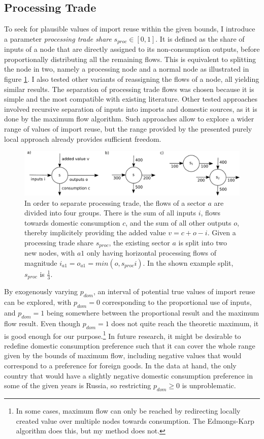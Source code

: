 \documentclass[english]{uzhpub}
\begin{document}
\subsection{Processing Trade}
To seek for plausible values of import reuse within the given bounds, I introduce a parameter \emph{processing trade share} $s_{proc} \in [0,1]$. It is defined as the share of inputs of a node that are directly assigned to its non-consumption outputs, before proportionally distributing all the remaining flows. This is equivalent to splitting the node in two, namely a processing node and a normal node as illustrated in figure \ref{fig:sketch}. I also tested other variants of reassigning the flows of a node, all yielding similar results. The separation of processing trade flows was chosen because it is simple and the most compatible with existing literature. Other tested approaches involved recursive separation of inputs into imports and domestic sources, as it is done by the maximum flow algorithm. Such approaches allow to explore a wider range of values of import reuse, but the range provided by the presented purely local approach already provides sufficient freedom.

\begin{figure}
\centering
\includegraphics[scale=0.8]{../results/sketch}
\caption{In order to separate processing trade, the flows of a sector $a$ are divided into four groups. There is the sum of all inputs $i$, flows towards domestic consumption $c$, and the sum of all other outputs $o$, thereby implicitely providing the added value $v = c + o - i$. Given a processing trade share $s_{proc}$, the existing sector $a$ is split into two new nodes, with $a1$ only having horizontal processing flows of magnitude $i_{a1}=o_{a1}=min(o, s_{proc}i)$. In the shown example split, $s_{proc}$ is $\frac{1}{3}$.}\label{fig:sketch}
\end{figure}

By exogenously varying $p_{dom}$, an interval of potential true values of import reuse can be explored, with $p_{dom}=0$ corresponding to the proportional use of inputs, and $p_{dom}=1$ being somewhere between the proportional result and the maximum flow result. Even though $p_{dom}=1$ does not quite reach the theoretic maximum, it is good enough for our purpose.\footnote{In some cases, maximum flow can only be reached by redirecting locally created value over multiple nodes towards consumption. The Edmongs-Karp algorithm does this, but my method does not.} In future research, it might be desirable to redefine domestic consumption preference such that it can cover the whole range given by the bounds of maximum flow, including negative values that would correspond to a preference for foreign goods. In the data at hand, the only country that would have a slightly negative domestic consumption preference in some of the given years is Russia, so restricting $p_{dom}\geq0$ is unproblematic.
\end{document}
